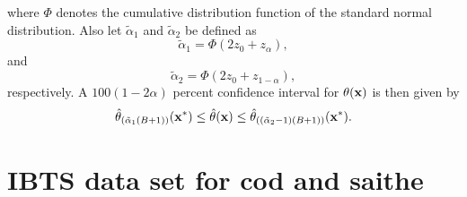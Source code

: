 \documentclass[a4paper 12pt]{article}
\numberwithin{equation}{section}
\begin{document}
\noindent where $  \Phi $  denotes the cumulative distribution function of the standard normal distribution. Also let $\tilde{\alpha}_{1} $ and $\tilde{\alpha}_{2} $ be defined as
\begin{equation}
\tilde{\alpha}_{1} = \Phi(2z_{0} + z_{\alpha}), 
\end{equation}
\noindent and 
\begin{equation}
\tilde{\alpha}_{2} = \Phi(2z_{0} + z_{1-\alpha}), 
\end{equation}
\noindent respectively.  A $100(1-2 \alpha)$ percent confidence interval for $ \theta ({\bf x})$ is then given by
\begin{equation}
\hat{\theta}_{\left(\tilde{\alpha}_{1}(B +1) \right)} ({\bf {x}^{*}})  \leq \hat{\theta} ({\bf x}) \leq \hat{\theta}_{\left((\tilde{\alpha}_{2} -1)(B +1) \right)} ({\bf {x}^{*}}). 
\end{equation}

\section{\large IBTS data set for cod and saithe}
\label{secAp:data}

\end{document}

